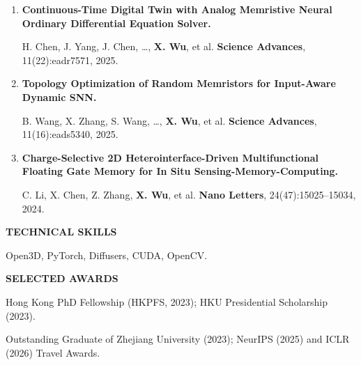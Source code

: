 \documentclass[a4paper]{article}
\newcommand{\cvsection}[1]{%
  \par\vspace{3.8pt}%
  {\color{cvblue}\fontsize{11}{12.2}\selectfont\bfseries\MakeUppercase{#1}}\par
  \vspace{-4pt}{\color{cvblue}\rule{\textwidth}{0.4pt}}\par\vspace{1.4pt}%
}
\begin{document}
{\begin{enumerate}[resume,leftmargin=1.6em,labelsep=0.38em,itemsep=1.5pt,topsep=1.3pt,parsep=0pt,partopsep=0pt]
X. Lyu, M. Liu, \textbf{X. Wu}, et al. \hfill \textbf{CVPR 2026}, pp.\ 7577--7587.
\item \textbf{Continuous-Time Digital Twin with Analog Memristive Neural Ordinary Differential Equation Solver.}\par
H. Chen, J. Yang, J. Chen, \ldots, \textbf{X. Wu}, et al. \hfill \textbf{Science Advances}, 11(22):eadr7571, 2025.
\item \textbf{Topology Optimization of Random Memristors for Input-Aware Dynamic SNN.}\par
B. Wang, X. Zhang, S. Wang, \ldots, \textbf{X. Wu}, et al. \hfill \textbf{Science Advances}, 11(16):eads5340, 2025.
\item \textbf{Charge-Selective 2D Heterointerface-Driven Multifunctional Floating Gate Memory for In Situ Sensing-Memory-Computing.}\par
C. Li, X. Chen, Z. Zhang, \textbf{X. Wu}, et al. \hfill \textbf{Nano Letters}, 24(47):15025--15034, 2024.
\end{enumerate}}

\cvsection{Technical Skills}
Open3D, PyTorch, Diffusers, CUDA, OpenCV.

\cvsection{Selected Awards}
Hong Kong PhD Fellowship (HKPFS, 2023); HKU Presidential Scholarship (2023).\par
Outstanding Graduate of Zhejiang University (2023); NeurIPS (2025) and ICLR (2026) Travel Awards.
\end{document}
